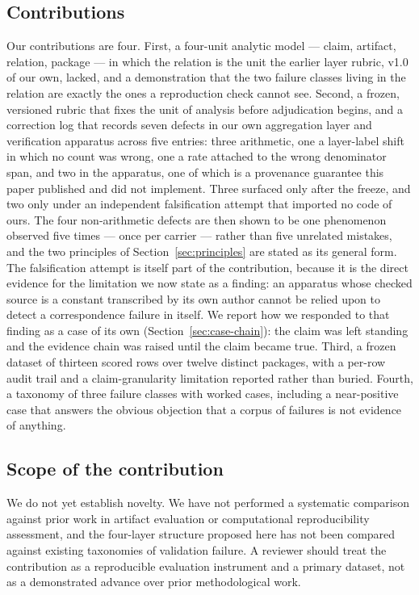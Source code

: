 \documentclass[sigconf,review]{acmart}
\begin{document}
\subsection{Contributions}
\label{sec:intro-contrib}

Our contributions are four. First, a four-unit analytic model --- claim,
artifact, relation, package --- in which the relation is the unit the earlier
layer rubric, v1.0 of our own, lacked, and a demonstration that the two
failure classes living
in the relation are exactly the ones a reproduction check cannot see. Second,
a frozen, versioned rubric that fixes the unit of analysis before adjudication
begins, and a correction log that records seven defects in our own aggregation
layer and verification apparatus across five entries: three arithmetic, one a
layer-label shift in which no count was wrong, one a rate attached to the wrong
denominator span, and two in the apparatus, one of which is a provenance
guarantee this paper published and did not implement. Three surfaced only after
the freeze, and two only under an independent falsification attempt that
imported no code of ours. The four non-arithmetic defects are then shown to be
one phenomenon observed five times --- once per carrier --- rather than five
unrelated mistakes, and the
two principles of Section~\ref{sec:principles} are stated as its general form.
The falsification attempt is itself part of the contribution, because it is the
direct evidence for the limitation we now state as a finding: an apparatus
whose checked source is a constant transcribed by its own author cannot be
relied upon to detect a correspondence failure in itself. We report how we
responded to that finding as a case of its own (Section~\ref{sec:case-chain}):
the claim was left standing and the evidence chain was raised until the claim
became true. Third, a frozen dataset of thirteen scored rows over twelve
distinct packages, with a per-row audit trail and a claim-granularity
limitation reported rather than buried. Fourth, a taxonomy of three failure
classes with worked cases, including a near-positive case that answers the
obvious objection that a corpus of failures is not evidence of anything.

\subsection{Scope of the contribution}
\label{sec:intro-scope}

We do not yet establish novelty. We have not performed a systematic
comparison against prior work in artifact evaluation or computational
reproducibility assessment, and the four-layer structure proposed here has not
been compared against existing taxonomies of validation failure. A reviewer
should treat the contribution as a reproducible evaluation instrument and a
primary dataset, not as a demonstrated advance over prior methodological work.
\end{document}
